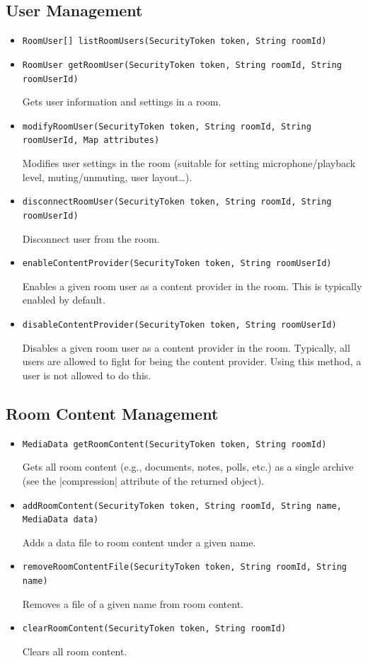 \documentclass[a4paper]{report}
\newenvironment{Api}{\begin{itemize}}{\end{itemize}}
\newcommand{\ApiCode}[1]{\lstinline[style=styleApi]|#1|}
\newcommand{\ApiItem}[1]{\item #1 %

}
\newcommand{\ApiCmd}[1]{\ApiItem{\ApiCode{#1}}}
\begin{document}
\subsection{User Management}
\begin{Api}

\ApiCmd{RoomUser[] listRoomUsers(SecurityToken token, String roomId)}

\ApiCmd{RoomUser getRoomUser(SecurityToken token, String roomId, String roomUserId)}
Gets user information and settings in a room.

\ApiCmd{modifyRoomUser(SecurityToken token, String roomId, String roomUserId, Map attributes)}
Modifies user settings in the room (suitable for setting
microphone/playback level, muting/unmuting, user layout\ldots).

\ApiCmd{disconnectRoomUser(SecurityToken token, String roomId, String roomUserId)}
Disconnect user from the room.

\ApiCmd{enableContentProvider(SecurityToken token, String roomUserId)}
Enables a given room user as a content provider in the room. This is typically enabled by default.

\ApiCmd{disableContentProvider(SecurityToken token, String roomUserId)}
Disables a given room user as a content provider in the room. Typically, all users are allowed to fight for being the content provider. Using this method, a user is not allowed to do this.

\end{Api}


\subsection{Room Content Management}
\begin{Api}

\ApiCmd{MediaData getRoomContent(SecurityToken token, String roomId)}
Gets all room content (e.g., documents, notes, polls, etc.) as a single archive (see the |compression| attribute of the returned object).

\ApiCmd{addRoomContent(SecurityToken token, String roomId, String name, MediaData data)}
Adds a data file to room content under a given name.

\ApiCmd{removeRoomContentFile(SecurityToken token, String roomId, String name)}
Removes a file of a given name from room content.

\ApiCmd{clearRoomContent(SecurityToken token, String roomId)}
Clears all room content.

\end{Api}
\end{document}
